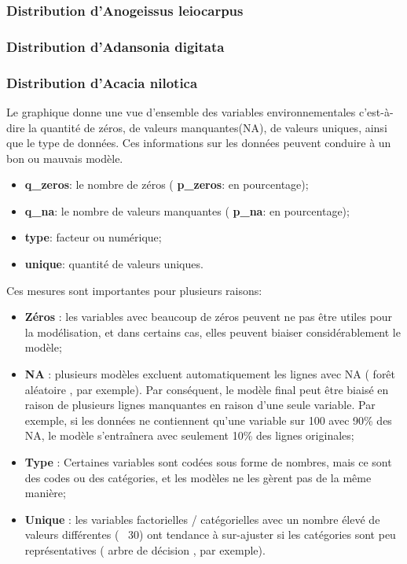\documentclass[a4paper, oneside, 12pt]{book}
\begin{document}
\subsubsection{Distribution d'Anogeissus leiocarpus}
\subsubsection{Distribution d'Adansonia digitata}
\subsubsection{Distribution d'Acacia nilotica}
Le graphique donne une vue d'ensemble des variables environnementales c'est-à-dire la quantité de zéros, de valeurs manquantes(NA), de valeurs uniques, ainsi que le type de données. Ces informations sur les données peuvent conduire à un bon ou mauvais modèle.
\begin{itemize}
	\item \textbf{q\_zeros}: le nombre de zéros ( \textbf{p\_zeros}: en pourcentage);
	\item \textbf{q\_na}: le nombre de valeurs manquantes ( \textbf{p\_na}: en pourcentage);
	\item \textbf{type}: facteur ou numérique;
	\item \textbf{unique}: quantité de valeurs uniques.
\end{itemize}
Ces mesures sont importantes pour plusieurs raisons:
\begin{itemize}
	\item \textbf{Zéros} : les variables avec beaucoup de zéros peuvent ne pas être utiles pour la modélisation, et dans certains cas, elles peuvent biaiser considérablement le modèle;
	\item \textbf{NA} : plusieurs modèles excluent automatiquement les lignes avec NA ( forêt aléatoire , par exemple). Par conséquent, le modèle final peut être biaisé en raison de plusieurs lignes manquantes en raison d'une seule variable. Par exemple, si les données ne contiennent qu'une variable sur 100 avec 90\% des NA, le modèle s'entraînera avec seulement 10\% des lignes originales;
	\item \textbf{Type} : Certaines variables sont codées sous forme de nombres, mais ce sont des codes ou des catégories, et les modèles ne les gèrent pas de la même manière;
	\item \textbf{Unique} : les variables factorielles / catégorielles avec un nombre élevé de valeurs différentes (~ 30) ont tendance à sur-ajuster si les catégories sont peu représentatives ( arbre de décision , par exemple).
\end{itemize}
\end{document}
